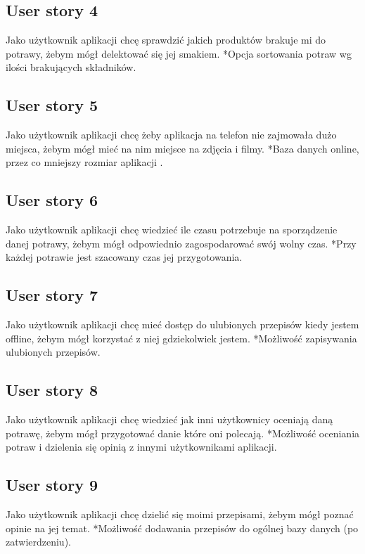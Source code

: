 \documentclass[a4paper]{article}
\begin{document}
	\subsection{User story 4}
	Jako użytkownik aplikacji chcę sprawdzić jakich produktów brakuje mi do potrawy, żebym mógł delektować się jej smakiem. \newline
	*Opcja sortowania potraw wg ilości brakujących składników.
	
	\subsection{User story 5}
	Jako użytkownik aplikacji chcę żeby aplikacja na telefon nie zajmowała dużo miejsca, żebym mógł mieć na nim miejsce na zdjęcia i filmy. \newline
	*Baza danych online, przez co mniejszy rozmiar aplikacji .
	
	\subsection{User story 6}
	Jako użytkownik aplikacji chcę wiedzieć ile czasu potrzebuje na sporządzenie danej potrawy, żebym mógł odpowiednio zagospodarować swój wolny czas. \newline
	*Przy każdej potrawie jest szacowany czas jej przygotowania.
	
	\subsection{User story 7}
	Jako użytkownik aplikacji chcę mieć dostęp do ulubionych przepisów kiedy jestem offline, żebym mógł korzystać z niej gdziekolwiek jestem. \newline
	*Możliwość zapisywania ulubionych przepisów.
	
	\subsection{User story 8}
	Jako użytkownik aplikacji chcę wiedzieć jak inni użytkownicy oceniają daną potrawę, żebym mógł przygotować danie które oni polecają. \newline
	*Możliwość oceniania potraw i dzielenia się opinią z innymi użytkownikami aplikacji.
	
	\subsection{User story 9}
	Jako użytkownik aplikacji chcę dzielić się moimi przepisami, żebym mógł poznać opinie na jej temat. \newline
	*Możliwość dodawania przepisów do ogólnej bazy danych (po zatwierdzeniu).
	
\end{document}
